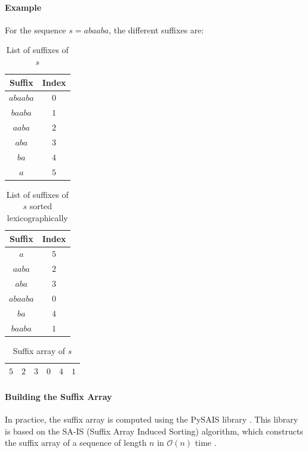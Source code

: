 \documentclass[conference]{IEEEtran}
\begin{document}
\paragraph{Example}
For the sequence $s = abaaba$, the different suffixes are:\\
\begin{table}[htbp]
\caption{List of suffixes of $s$}
\begin{center}
\begin{tabular}{|c|c|}
\hline
\textbf{Suffix} & \textbf{Index}\\
\hline
$abaaba$ & $0$\\
\hline
$baaba$ & $1$\\
\hline
$aaba$ & $2$\\
\hline
$aba$ & $3$\\
\hline
$ba$ & $4$\\
\hline
$a$ & $5$\\
\hline
\end{tabular}
\end{center}
\end{table}

\begin{table}[htbp]
\caption{List of suffixes of $s$ sorted lexicographically}
\begin{center}
\begin{tabular}{|c|c|}
\hline
\textbf{Suffix} & \textbf{Index}\\
\hline
$a$ & $5$\\
\hline
$aaba$ & $2$\\
\hline
$aba$ & $3$\\
\hline
$abaaba$ & $0$\\
\hline
$ba$ & $4$\\
\hline
$baaba$ & $1$\\
\hline
\end{tabular}
\end{center}
\end{table}
\begin{table}[htbp]
\caption{Suffix array of $s$}
\begin{center}
\begin{tabular}{|c|c|c|c|c|c|}
\hline
$5$ & $2$ & $3$ & $0$ & $4$ & $1$\\
\hline
\end{tabular}
\end{center}
\end{table}

\paragraph{Building the Suffix Array}
In practice, the suffix array is computed using the PySAIS library \cite{b2}. This library is based on the SA-IS (Suffix Array Induced Sorting) algorithm, which constructs the suffix array of a sequence of length $n$ in $\mathcal O(n)$ time \cite{b3}.
\end{document}
